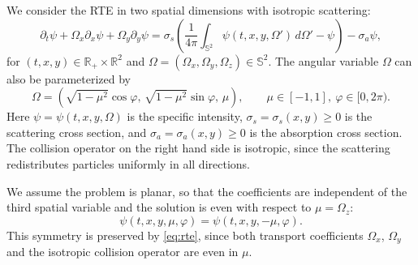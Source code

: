 \documentclass[11pt]{article}
\numberwithin{equation}{section}
\begin{document}
We consider the RTE in two spatial dimensions with isotropic scattering:
\begin{equation}\label{eq:rte}
\partial_t \psi + \Omega_x\partial_x\psi + \Omega_y\partial_y\psi
= \sigma_s\left(\frac{1}{4\pi}\int_{\mathbb S^2}\psi(t,x,y,\Omega')\,d\Omega' - \psi\right) - \sigma_a\psi,
\end{equation}
for $(t,x,y)\in \mathbb R_+\times\mathbb R^2$ and $\Omega=(\Omega_x,\Omega_y,\Omega_z)\in \mathbb S^2$. The angular variable $\Omega$ can also be parameterized by
\begin{equation}
    \Omega=(\sqrt{1-\mu^2}\cos\varphi,\,\sqrt{1-\mu^2}\sin\varphi,\,\mu), \qquad \mu\in[-1,1],\ \varphi\in[0,2\pi).
\end{equation}
Here $\psi = \psi(t,x,y,\Omega)$ is the specific intensity, $\sigma_s = \sigma_s(x,y) \ge 0$ is the scattering cross section, and $\sigma_a = \sigma_a(x,y) \ge 0$ is the absorption cross section. The collision operator on the right hand side is isotropic, since the scattering redistributes particles uniformly in all directions.

We assume the problem is planar, so that the coefficients are independent of the third spatial variable and the solution is even with respect to $\mu=\Omega_z$:
\[
\psi(t,x,y,\mu,\varphi)=\psi(t,x,y,-\mu,\varphi).
\]
This symmetry is preserved by \eqref{eq:rte}, since both transport coefficients $\Omega_x$, $\Omega_y$ and the isotropic collision operator are even in $\mu$.
\end{document}
